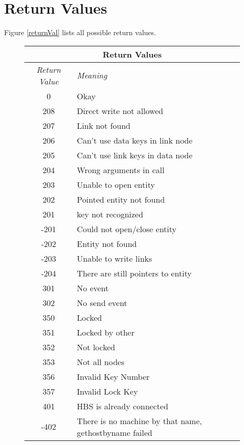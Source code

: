 \section{Return Values}

Figure \ref{returnVal} lists all possible return values.
\small

\begin{figure}[htpb]
  \begin{center}
    \begin{tabular} {|c|l|} \hline
      \multicolumn{2}{|c|}{{\bf Return Values}} \\ \hline {\em Return
      Value} & {\em Meaning}\\ \hline 
      0 & Okay \\ \hline 
      208 & Direct write not allowed \\ \hline 
      207 & Link not found \\ \hline 
      206 & Can't use data keys in link node \\ \hline 
      205 & Can't use link keys in data node \\ \hline 
      204 & Wrong arguments in call \\ \hline 
      203 & Unable to open entity \\ \hline 
      202 & Pointed entity not found \\ \hline 
      201 & key not recognized \\ \hline
      -201 & Could not open/close entity \\ \hline 
      -202 & Entity not found \\ \hline 
      -203 & Unable to write links \\ \hline 
      -204 & There are still pointers to entity \\ \hline 
      301 & No event \\ \hline 
      302 & No send event \\ \hline 
      350 & Locked \\ \hline 
      351 & Locked by other \\ \hline 
      352 & Not locked \\ \hline 
      353 & Not all nodes \\ \hline 
      356 & Invalid Key Number \\ \hline 
      357 & Invalid Lock Key \\ \hline 
      401 & HBS is already connected \\ \hline 
      -402 & There is no machine by that name, gethostbyname failed \\

\end{tabular}
\end{center}
\end{figure}
